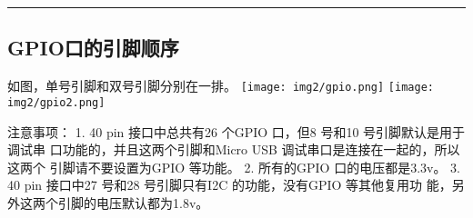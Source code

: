 \begin{center}\rule{0.5\linewidth}{0.5pt}\end{center}

\hypertarget{gpioux53e3ux7684ux5f15ux811aux987aux5e8f}{%
\subsection{GPIO口的引脚顺序}\label{gpioux53e3ux7684ux5f15ux811aux987aux5e8f}}

如图，单号引脚和双号引脚分别在一排。 \texttt{[image: img2/gpio.png]}
\texttt{[image: img2/gpio2.png]}

注意事项： 1. 40 pin 接口中总共有26 个GPIO 口，但8 号和10
号引脚默认是用于调试串 口功能的，并且这两个引脚和Micro USB
调试串口是连接在一起的，所以这两个 引脚请不要设置为GPIO 等功能。 2.
所有的GPIO 口的电压都是3.3v。 3. 40 pin 接口中27 号和28 号引脚只有I2C
的功能，没有GPIO 等其他复用功 能，另外这两个引脚的电压默认都为1.8v。
